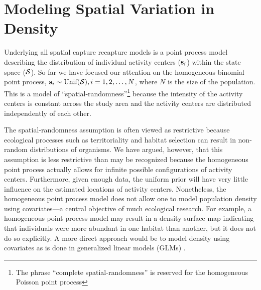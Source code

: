 


\chapter{%
Modeling Spatial Variation in Density
}
\label{chapt.state-space}

\vspace{0.3cm}

Underlying all spatial capture recapture models is a point process
model describing the distribution of individual activity
centers (${\bf s}_i$) within the state space ($\cal{S}$). So far we have focused our
attention on the homogeneous binomial point process,
${\bf s}_i \sim \mbox{Unif}({\cal S}), i=1,2,\dots,N$, where $N$ is the
size of the population. This is a model of
``spatial-randomness''\footnote{The phrase ``complete
  spatial-randomness'' is reserved for the homogeneous Poisson point
  process}
because the intensity of the
activity centers is constant across the study area and the activity
centers are distributed independently of each other.

The spatial-randomness assumption is often viewed as restrictive
because ecological processes such as
territoriality and habitat selection can result in non-random
distributions of organisms. We have argued, however, that this
assumption is less restrictive than may be recognized because the
homogeneous point process actually allows for infinite
possible configurations of activity centers. Furthermore, given enough data,
the uniform prior will have very little influence on the estimated
locations of activity centers. Nonetheless, the homogeneous point
process model does not allow one to model population density using
covariates---a central objective of much ecological research.
For example, a homogeneous point process model
may result in a density surface map indicating that individuals were
more abundant in one habitat than another, but it does not do so
explicitly. A more direct approach would be to model density using
covariates as is done in generalized linear models (GLMs)
\citep{mccullagh_nelder:1989}. %

